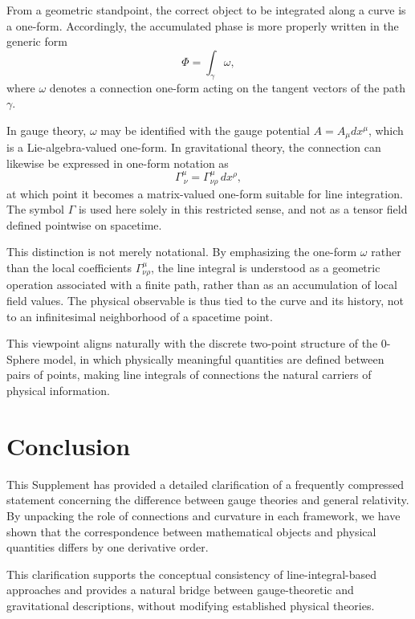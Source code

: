 \documentclass[12pt,letterpaper]{article} %
\begin{document}
From a geometric standpoint, the correct object to be integrated along a curve is a one-form. Accordingly, the accumulated phase is more properly written in the generic form
\begin{equation}
\Phi = \int_\gamma \omega ,
\end{equation}
where $\omega$ denotes a connection one-form acting on the tangent vectors of the path $\gamma$.

In gauge theory, $\omega$ may be identified with the gauge potential $A = A_\mu dx^\mu$, which is a Lie-algebra-valued one-form. In gravitational theory, the connection can likewise be expressed in one-form notation as
\begin{equation}
\Gamma^\mu_{\ \nu} = \Gamma^\mu_{\nu\rho}\, dx^\rho ,
\end{equation}
at which point it becomes a matrix-valued one-form suitable for line integration. The symbol $\Gamma$ is used here solely in this restricted sense, and not as a tensor field defined pointwise on spacetime.

This distinction is not merely notational. By emphasizing the one-form $\omega$ rather than the local coefficients $\Gamma^\mu_{\nu\rho}$, the line integral is understood as a geometric operation associated with a finite path, rather than as an accumulation of local field values. The physical observable is thus tied to the curve and its history, not to an infinitesimal neighborhood of a spacetime point.

This viewpoint aligns naturally with the discrete two-point structure of the 0-Sphere model, in which physically meaningful quantities are defined between pairs of points, making line integrals of connections the natural carriers of physical information.

\section{Conclusion}

\justifying
This Supplement has provided a detailed clarification of a frequently compressed statement concerning the difference between gauge theories and general relativity. By unpacking the role of connections and curvature in each framework, we have shown that the correspondence between mathematical objects and physical quantities differs by one derivative order.

This clarification supports the conceptual consistency of line-integral-based approaches and provides a natural bridge between gauge-theoretic and gravitational descriptions, without modifying established physical theories.
\end{document}
